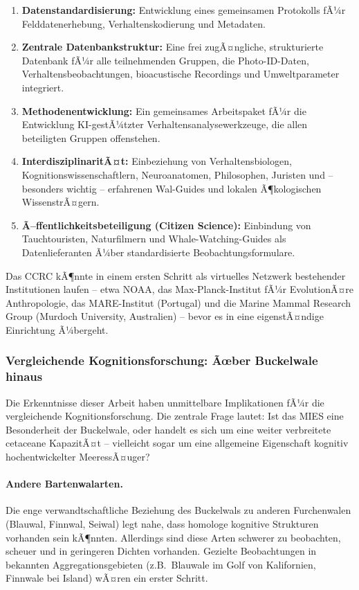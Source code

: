 ﻿\documentclass[12pt,a4paper]{article}
\theoremstyle{definition}
\theoremstyle{remark}
\begin{document}
\begin{enumerate}[leftmargin=*, label=\textbf{K\arabic*.}]
  \item \textbf{Datenstandardisierung:} Entwicklung eines gemeinsamen Protokolls
        fÃ¼r Felddatenerhebung, Verhaltenskodierung und Metadaten.
  \item \textbf{Zentrale Datenbankstruktur:} Eine frei zugÃ¤ngliche, strukturierte
        Datenbank fÃ¼r alle teilnehmenden Gruppen, die Photo-ID-Daten, Verhaltensbeobachtungen,
        bioacustische Recordings und Umweltparameter integriert.
  \item \textbf{Methodenentwicklung:} Ein gemeinsames Arbeitspaket fÃ¼r die Entwicklung
        KI-gestÃ¼tzter Verhaltensanalysewerkzeuge, die allen beteiligten Gruppen offenstehen.
  \item \textbf{InterdisziplinaritÃ¤t:} Einbeziehung von Verhaltensbiologen, Kognitionswissenschaftlern,
        Neuroanatomen, Philosophen, Juristen und -- besonders wichtig --
        erfahrenen Wal-Guides und lokalen Ã¶kologischen WissenstrÃ¤gern.
  \item \textbf{Ã–ffentlichkeitsbeteiligung (Citizen Science):} Einbindung von
        Tauchtouristen, Naturfilmern und Whale-Watching-Guides als Datenlieferanten
        Ã¼ber standardisierte Beobachtungsformulare.
\end{enumerate}

Das CCRC kÃ¶nnte in einem ersten Schritt als virtuelles Netzwerk bestehender Institutionen laufen -- etwa NOAA, das Max-Planck-Institut fÃ¼r EvolutionÃ¤re Anthropologie, das MARE-Institut (Portugal) und die Marine Mammal Research Group (Murdoch University, Australien) -- bevor es in eine eigenstÃ¤ndige Einrichtung Ã¼bergeht.

\subsubsection{Vergleichende Kognitionsforschung: Ãœber Buckelwale hinaus}

Die Erkenntnisse dieser Arbeit haben unmittelbare Implikationen fÃ¼r die vergleichende Kognitionsforschung. Die zentrale Frage lautet: Ist das MIES eine Besonderheit der Buckelwale, oder handelt es sich um eine weiter verbreitete cetaceane KapazitÃ¤t -- vielleicht sogar um eine allgemeine Eigenschaft kognitiv hochentwickelter MeeressÃ¤uger?

\paragraph{Andere Bartenwalarten.}
Die enge verwandtschaftliche Beziehung des Buckelwals zu anderen Furchenwalen (Blauwal, Finnwal, Seiwal) legt nahe, dass homologe kognitive Strukturen vorhanden sein kÃ¶nnten. Allerdings sind diese Arten schwerer zu beobachten, scheuer und in geringeren Dichten vorhanden. Gezielte Beobachtungen in bekannten Aggregationsgebieten (z.B.\ Blauwale im Golf von Kalifornien, Finnwale bei Island) wÃ¤ren ein erster Schritt.
\end{document}
